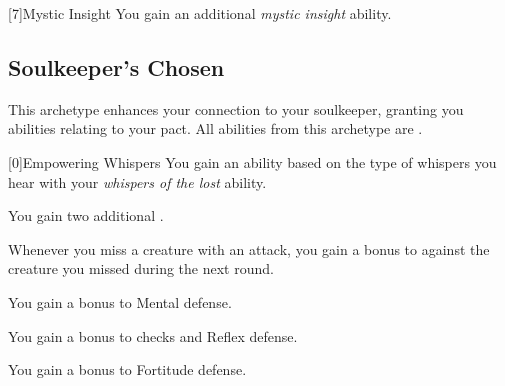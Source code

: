         [7]{Mystic Insight}
        You gain an additional \textit{mystic insight} ability.

    \newpage
    \subsection{Soulkeeper's Chosen}
        This archetype enhances your connection to your soulkeeper, granting you abilities relating to your pact.
        All abilities from this archetype are .

        [0]{Empowering Whispers}
        You gain an ability based on the type of whispers you hear with your \textit{whispers of the lost} ability.
        {
             You gain two additional .

             Whenever you miss a creature with an attack, you gain a  bonus to  against the creature you missed during the next round.

             You gain a  bonus to Mental defense.

             You gain a  bonus to  checks and Reflex defense.

             You gain a  bonus to Fortitude defense.
        }

